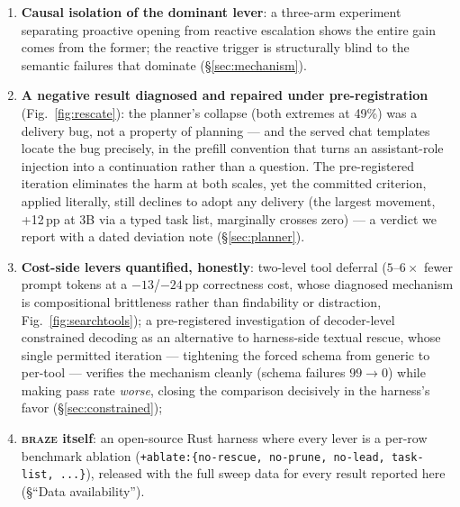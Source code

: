 \documentclass[smallcondensed,natbib]{svjour3}
\newcommand{\braze}{\textsc{braze}}
\begin{document}
\begin{enumerate}
    even edits (0 patches / 40 runs), the lead lever's behavioral
    effect transfers outside noise (patches 0/40~$\to$~6/40,
    $p{=}0.026$) with resolution moving directionally (one Django
    issue resolved in both repetitions), and the pinned-ceiling
    pattern replicates on execution-graded tasks
    (\S\ref{sec:swebench}).
  \item \textbf{Causal isolation of the dominant lever}: a three-arm
    experiment separating proactive opening from reactive escalation
    shows the entire gain comes from the former; the reactive trigger
    is structurally blind to the semantic failures that dominate
    (\S\ref{sec:mechanism}).
  \item \textbf{A negative result diagnosed and repaired under
    pre-registration} (Fig.~\ref{fig:rescate}): the planner's collapse
    (both extremes at 49\%) was a delivery bug, not a property of
    planning --- and the served chat templates locate the bug
    precisely, in the prefill convention that turns an assistant-role
    injection into a continuation rather than a question. The
    pre-registered iteration eliminates the harm at both
    scales, yet the committed criterion, applied literally, still
    declines to adopt any delivery (the largest movement, +12\,pp at
    3B via a typed task list, marginally crosses zero) --- a verdict
    we report with a dated deviation note (\S\ref{sec:planner}).
  \item \textbf{Cost-side levers quantified, honestly}: two-level tool
    deferral ($5$--$6\times$ fewer prompt tokens at a $-13$/$-24$\,pp
    correctness cost, whose diagnosed mechanism is compositional
    brittleness rather than findability or distraction,
    Fig.~\ref{fig:searchtools}); a pre-registered investigation of
    decoder-level constrained decoding as an alternative to harness-side
    textual rescue, whose single permitted iteration --- tightening the
    forced schema from generic to per-tool --- verifies the mechanism
    cleanly (schema failures $99\to0$) while making pass rate
    \emph{worse}, closing the comparison decisively in the harness's
    favor (\S\ref{sec:constrained});
  \item \textbf{\braze{} itself}: an open-source Rust harness where
    every lever is a per-row benchmark ablation
    (\texttt{+ablate:\{no-rescue, no-prune, no-lead, task-list, ...\}}),
    released with the full sweep data for every result reported here
    (\S``Data availability'').
\end{enumerate}
\end{document}
